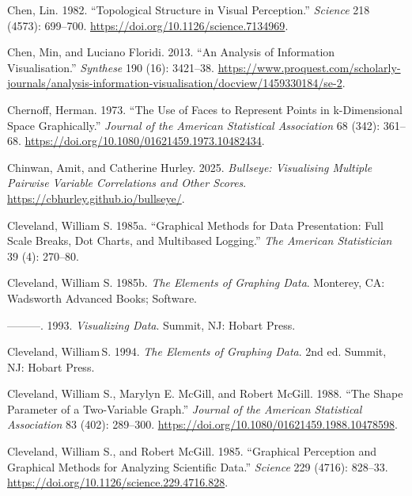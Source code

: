 \documentclass[
  letterpaper,
  DIV=11,
  numbers=noendperiod]{scrreprt}
\newlength{\cslhangindent}
\newenvironment{CSLReferences}[2] %
 {\begin{list}{}{%
  \setlength{\itemindent}{0pt}
  \setlength{\leftmargin}{0pt}
  \setlength{\parsep}{0pt}
  \ifodd #1
   \setlength{\leftmargin}{\cslhangindent}
   \setlength{\itemindent}{-1\cslhangindent}
  \fi
  \setlength{\itemsep}{#2\baselineskip}}}
 {\end{list}}
\begin{document}
\begin{CSLReferences}{1}{0}
Chen, Lin. 1982. {``Topological Structure in Visual Perception.''}
\emph{Science} 218 (4573): 699--700.
\url{https://doi.org/10.1126/science.7134969}.

Chen, Min, and Luciano Floridi. 2013. {``An Analysis of Information
Visualisation.''} \emph{Synthese} 190 (16): 3421--38.
\url{https://www.proquest.com/scholarly-journals/analysis-information-visualisation/docview/1459330184/se-2}.

Chernoff, Herman. 1973. {``The Use of Faces to Represent Points in
k-Dimensional Space Graphically.''} \emph{Journal of the American
Statistical Association} 68 (342): 361--68.
\url{https://doi.org/10.1080/01621459.1973.10482434}.

Chinwan, Amit, and Catherine Hurley. 2025. \emph{Bullseye: Visualising
Multiple Pairwise Variable Correlations and Other Scores}.
\url{https://cbhurley.github.io/bullseye/}.

Cleveland, William S. 1985a. {``Graphical Methods for Data Presentation:
Full Scale Breaks, Dot Charts, and Multibased Logging.''} \emph{The
American Statistician} 39 (4): 270--80.

Cleveland, William S. 1985b. \emph{The Elements of Graphing Data}.
Monterey, CA: Wadsworth Advanced Books; Software.

---------. 1993. \emph{Visualizing Data}. Summit, NJ: Hobart Press.

Cleveland, William S. 1994. \emph{The Elements of Graphing Data}. 2nd
ed. Summit, NJ: Hobart Press.

Cleveland, William S., Marylyn E. McGill, and Robert McGill. 1988.
{``The Shape Parameter of a Two-Variable Graph.''} \emph{Journal of the
American Statistical Association} 83 (402): 289--300.
\url{https://doi.org/10.1080/01621459.1988.10478598}.

Cleveland, William S., and Robert McGill. 1985. {``Graphical Perception
and Graphical Methods for Analyzing Scientific Data.''} \emph{Science}
229 (4716): 828--33. \url{https://doi.org/10.1126/science.229.4716.828}.


\end{CSLReferences}
\end{document}
